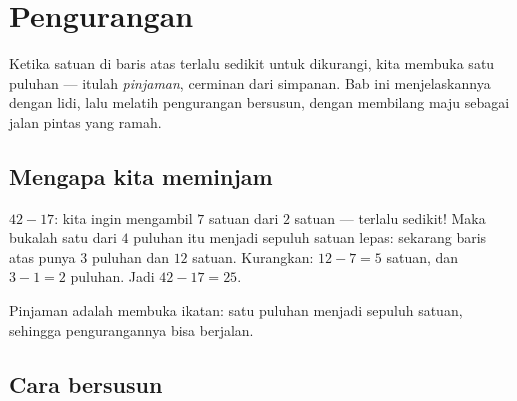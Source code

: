 \chapter{Pengurangan}\label{ch:g2:subtraction}

Ketika satuan di baris atas terlalu sedikit untuk dikurangi, kita
membuka satu puluhan --- itulah \emph{pinjaman}, cerminan dari
simpanan. Bab ini menjelaskannya dengan lidi, lalu melatih
pengurangan bersusun, dengan membilang maju sebagai jalan pintas
yang ramah.

\section{Mengapa kita meminjam}

\begin{example}\label{ex:g2:subtraction:unbundle}
$42 - 17$: kita ingin mengambil $7$ satuan dari $2$ satuan --- terlalu
sedikit! Maka bukalah satu dari $4$ puluhan itu menjadi sepuluh
satuan lepas: sekarang baris atas punya $3$ puluhan dan $12$ satuan.
Kurangkan: $12 - 7 = 5$ satuan, dan $3 - 1 = 2$ puluhan. Jadi
$42 - 17 = 25$.
\end{example}

\begin{omfigure}

{\small Pinjaman adalah membuka ikatan: satu puluhan menjadi sepuluh
satuan, sehingga pengurangannya bisa berjalan.}
\end{omfigure}

\section{Cara bersusun}

